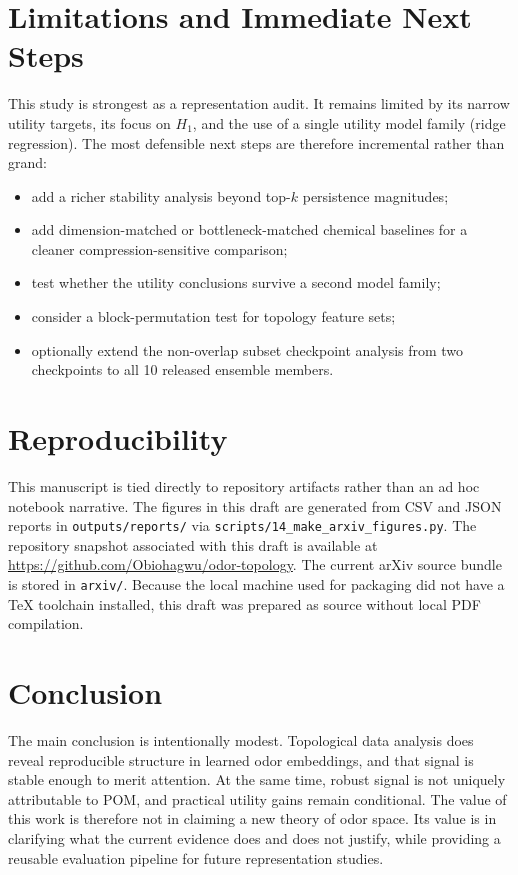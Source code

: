 \documentclass[11pt]{article}
\begin{document}
\section{Limitations and Immediate Next Steps}

This study is strongest as a representation audit. It remains limited by its narrow utility targets, its focus on $H_1$, and the use of a single utility model family (ridge regression). The most defensible next steps are therefore incremental rather than grand:

\begin{itemize}
  \item add a richer stability analysis beyond top-$k$ persistence magnitudes;
  \item add dimension-matched or bottleneck-matched chemical baselines for a cleaner compression-sensitive comparison;
  \item test whether the utility conclusions survive a second model family;
  \item consider a block-permutation test for topology feature sets;
  \item optionally extend the non-overlap subset checkpoint analysis from two checkpoints to all 10 released ensemble members.
\end{itemize}

\section{Reproducibility}

This manuscript is tied directly to repository artifacts rather than an ad hoc notebook narrative. The figures in this draft are generated from CSV and JSON reports in \texttt{outputs/reports/} via \texttt{scripts/14\_make\_arxiv\_figures.py}. The repository snapshot associated with this draft is available at \url{https://github.com/Obiohagwu/odor-topology}. The current arXiv source bundle is stored in \texttt{arxiv/}. Because the local machine used for packaging did not have a TeX toolchain installed, this draft was prepared as source without local PDF compilation.

\section{Conclusion}

The main conclusion is intentionally modest. Topological data analysis does reveal reproducible structure in learned odor embeddings, and that signal is stable enough to merit attention. At the same time, robust signal is not uniquely attributable to POM, and practical utility gains remain conditional. The value of this work is therefore not in claiming a new theory of odor space. Its value is in clarifying what the current evidence does and does not justify, while providing a reusable evaluation pipeline for future representation studies.
\end{document}
